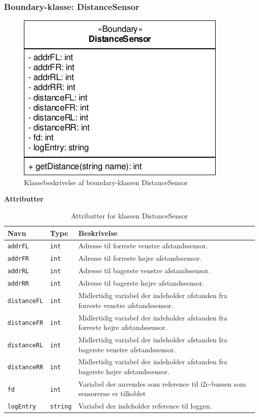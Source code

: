 \subsubsection{Boundary-klasse: DistanceSensor}

\begin{figure}[h]
\centering
\includegraphics[]{../fig/diagrammer/bil/cd_distancesensor.pdf}
\caption{Klassebeskrivelse af boundary-klassen DistanceSensor}
\label{fig:cd_distancesensor}
\end{figure}

\textbf{Attributter}

\begin{table}[h]
\begin{tabularx}{\textwidth}{| Z | Z | L{10cm} |} \hline
Navn & Type & Beskrivelse \\\hline
\texttt{addrFL} & \texttt{int} &Adresse til forreste venstre afstandssensor.\\\hline
\texttt{addrFR} & \texttt{int} &Adresse til forreste højre afstandssensor.\\\hline
\texttt{addrRL} & \texttt{int} &Adresse til bagerste venstre afstandssensor.\\\hline
\texttt{addrRR} & \texttt{int} &Adresse til bagerste højre afstandssensor.\\\hline
\texttt{distanceFL} & \texttt{int} &Midlertidig variabel der indeholder afstanden fra forreste venstre afstandssensor.\\\hline
\texttt{distanceFR} & \texttt{int} &Midlertidig variabel der indeholder afstanden fra forreste højre afstandssensor.\\\hline
\texttt{distanceRL} & \texttt{int} &Midlertidig variabel der indeholder afstanden fra bagerste venstre afstandssensor.\\\hline
\texttt{distanceRR} & \texttt{int} &Midlertidig variabel der indeholder afstanden fra bagerste højre afstandssensor.\\\hline
\texttt{fd} & \texttt{int} &Variabel der anvendes som reference til i2c-bussen som sensorerne er tilkoblet\\\hline
\texttt{logEntry} & \texttt{string} &Variabel der indeholder reference til loggen.\\\hline
\end{tabularx}
\caption{Attributter for klassen DistanceSensor}
\label{table:attr_distancesensor}
\end{table}

